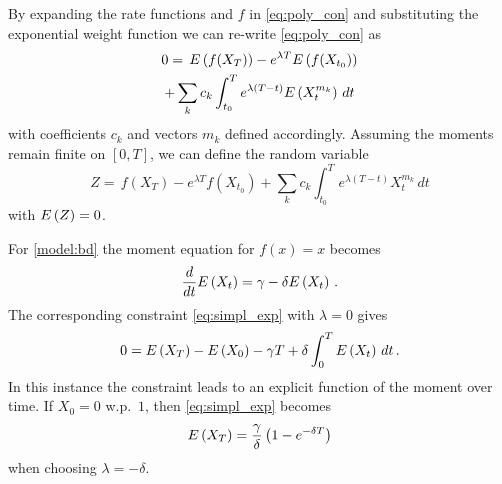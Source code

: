 By expanding the rate functions and $f$ in \eqref{eq:poly_con} and substituting the
exponential weight function we can re-write \eqref{eq:poly_con} as
\begin{multline}\label{eq:simpl_exp}
        0 =\,
         {E}\left(f(X_{T})\right)
        - e^{\lambda T}{E}\left(f(X_{t_0})\right)\\
        + \sum_{k}c_k\int_{t_0}^{T}e^{\lambda(T-t)}{E}\left(X_t^{m_k}\right)\,dt
\end{multline}
with coefficients $c_k$ and vectors $m_k$ defined accordingly.
Assuming the moments remain finite on $[0,T]$, we can define the random variable
\begin{equation}\label{eq:z}
        Z =\,
         f(X_{T})
        - e^{\lambda T}f(X_{t_0})
        + \sum_{k}c_k\int_{t_0}^{T}e^{\lambda(T-t)}X_t^{m_k}\,dt
\end{equation}
with ${E}\left(Z\right)=0$.
\begin{example}
For \autoref{model:bd} the moment equation for $f(x)=x$ becomes
	\[
		\frac{d}{dt}{E}\left(X_t\right)=\gamma - \delta{E}\left(X_t\right)\,.
	\]
The corresponding constraint \eqref{eq:simpl_exp} with $\lambda=0$ gives
	\[
		0={E}\left(X_T\right) - {E}\left(X_0\right) - \gamma T + \delta \int_0^{T} {E}\left(X_t\right)\,dt\,.
	\]
In this instance the constraint  leads to an explicit function of
the moment over time. If  $X_0=0$ w.p.\ $1$, then \eqref{eq:simpl_exp} becomes
\begin{equation}\label{eq:bd_constraint}
{E}\left(X_T\right) = \frac{\gamma}{\delta} \left(1 - e^{-\delta T}\right)
\end{equation}
when choosing $\lambda=-\delta$.
\end{example}


